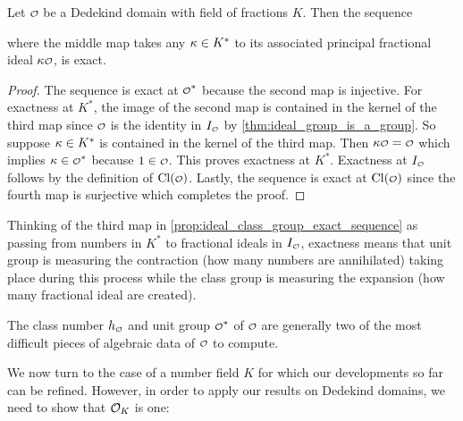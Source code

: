     \begin{proposition}\label{prop:ideal_class_group_exact_sequence}
      Let $\smc{O}$ be a Dedekind domain with field of fractions $K$. Then the sequence

      \begin{center}
      \end{center}

      where the middle map takes any $\kappa \in K^{\ast}$ to its associated principal fractional ideal $\k\smc{O}$, is exact.
    \end{proposition}
    \begin{proof}
      The sequence is exact at $\smc{O}^{\ast}$ because the second map is injective. For exactness at $K^{\ast}$, the image of the second map is contained in the kernel of the third map since $\smc{O}$ is the identity in $I_{\smc{O}}$ by \cref{thm:ideal_group_is_a_group}. So suppose $\kappa \in K^{\ast}$ is contained in the kernel of the third map. Then $\k\smc{O} = \smc{O}$ which implies $\k \in \smc{O}^{\ast}$ because $1 \in \smc{O}$. This proves exactness at $K^{\ast}$. Exactness at $I_{\smc{O}}$ follows by the definition of $\Cl(\smc{O})$. Lastly, the sequence is exact at $\Cl(\smc{O})$ since the fourth map is surjective which completes the proof.
    \end{proof}

    Thinking of the third map in \cref{prop:ideal_class_group_exact_sequence} as passing from numbers in $K^{\ast}$ to fractional ideals in $I_{\smc{O}}$, exactness means that unit group is measuring the contraction (how many numbers are annihilated) taking place during this process while the class group is measuring the expansion (how many fractional ideal are created).
    
    \begin{remark}
      The class number $h_{\smc{O}}$ and unit group $\smc{O}^{\ast}$ of $\smc{O}$ are generally two of the most difficult pieces of algebraic data of $\smc{O}$ to compute.
    \end{remark}
    
    We now turn to the case of a number field $K$ for which our developments so far can be refined. However, in order to apply our results on Dedekind domains, we need to show that $\mathcal{O}_{K}$ is one:

